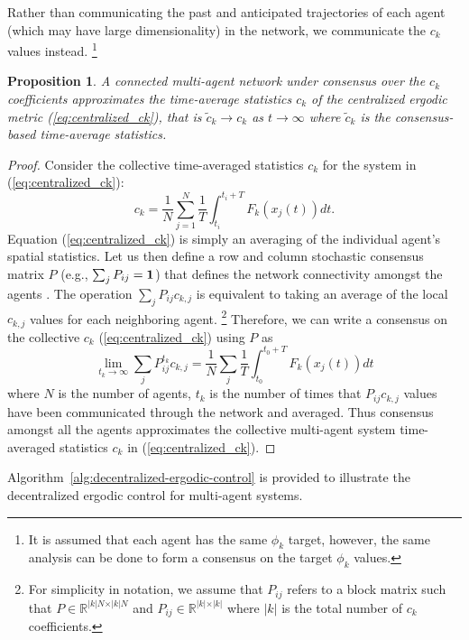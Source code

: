 \documentclass[letterpaper, 10 pt, conference]{ieeeconf}  %
\newtheorem{proposition}{Proposition}
\begin{document}
Rather than communicating the past and anticipated trajectories of each agent (which may have large dimensionality) in the network, we communicate the $c_k$ values instead. \footnote{It is assumed that each agent has the same $\phi_k$ target, however, the same analysis can be done to form a consensus on the target $\phi_k$ values.}
\begin{proposition}
A connected multi-agent network under consensus over the $c_k$ coefficients approximates the time-average statistics $c_k$ of the centralized ergodic metric (\ref{eq:centralized_ck}), that is $\tilde{c}_k \to c_k$ as $t \to \infty$ where $\tilde{c}_k$ is the consensus-based time-average statistics.
\end{proposition}
\begin{proof}
Consider the collective time-averaged statistics $c_k$ for the system in (\ref{eq:centralized_ck}):
\begin{equation*}
c_k = \frac{1}{N} \sum_{j=1}^N \frac{1}{T} \int_{t_i}^{t_i + T} F_k(x_j(t))dt.
\end{equation*}
Equation (\ref{eq:centralized_ck}) is simply an averaging of the individual agent's spatial statistics. 
Let us then define a row and column stochastic consensus matrix $P$ (e.g., $\sum_j P_{ij} = \bold{1}$) that defines the network connectivity amongst the agents \cite{deo2016graph, bertsekas1989parallel}.
The operation $\sum_j P_{ij} c_{k,j}$ is equivalent to taking an average of the local $c_{k,j}$ values for each neighboring agent. \footnote{For simplicity in notation, we assume that $P_{ij}$ refers to a block matrix such that $P \in \mathbb{R}^{\vert k \vert N \times \vert k \vert N}$ and $P_{ij} \in \mathbb{R}^{\vert k \vert \times \vert k \vert}$ where $\vert k \vert$ is the total number of $c_k$ coefficients.} 
Therefore, we can write a consensus on the collective $c_k$ (\ref{eq:centralized_ck}) using $P$ as \cite{deo2016graph, bertsekas1989parallel}
\begin{equation*}
\lim_{t_k \to \infty}\sum_j P_{ij}^{t_k} c_{k,j} = \frac{1}{N}\sum_j \frac{1}{T} \int_{t_0}^{t_0 +T} F_k(x_j(t)) dt
\end{equation*}
where $N$ is the number of agents, $t_k$ is the number of times that $P_{ij}c_{k,j}$ values have been communicated through the network and averaged.
Thus consensus amongst all the agents approximates the collective multi-agent system time-averaged statistics $c_k$ in (\ref{eq:centralized_ck}).
\end{proof}
Algorithm~\ref{alg:decentralized-ergodic-control} is provided to illustrate the decentralized ergodic control for multi-agent systems.
\end{document}
